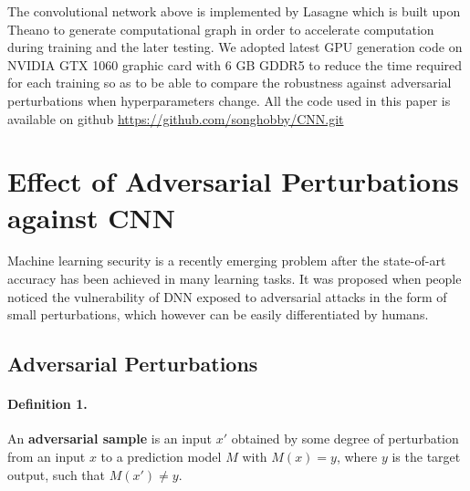 \documentclass{article}
\begin{document}
The convolutional network above is implemented by Lasagne\cite{Lasagne} which is built upon Theano\cite{Theano} to generate computational graph in order to accelerate computation during training and the later testing.
We adopted latest GPU generation code on NVIDIA GTX 1060 graphic card with 6 GB GDDR5 to reduce the time required for each training so as to be able to compare the robustness against adversarial perturbations when hyperparameters change.
All the code used in this paper is available on github \url{https://github.com/songhobby/CNN.git}

\section{Effect of Adversarial Perturbations against CNN}
Machine learning security is a recently emerging problem after the state-of-art accuracy has been achieved in many learning tasks. It was proposed when people noticed the vulnerability of DNN exposed to adversarial attacks in the form of small perturbations, which however can be easily differentiated by humans.
\subsection{Adversarial Perturbations}
\paragraph{Definition 1.}
An \textbf{adversarial sample} is an input $x\prime$ obtained by some degree of perturbation from an input $x$ to a prediction model $M$ with $M(x)=y$, where $y$ is the target output, such that $M(x\prime) \ne y$.
\end{document}
